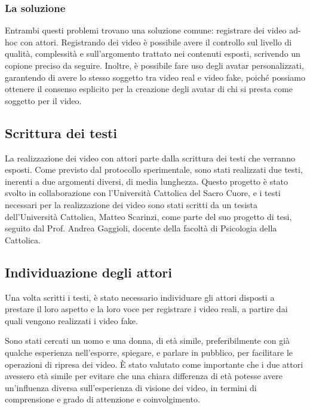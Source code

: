 \subsubsection{La soluzione}

Entrambi questi problemi trovano una soluzione comune: registrare dei video ad-hoc con attori. Registrando dei video è possibile avere il controllo sul livello di qualità, complessità e sull'argomento trattato nei contenuti esposti, scrivendo un copione preciso da seguire. Inoltre, è possibile fare uso degli avatar personalizzati, garantendo di avere lo stesso soggetto tra video real e video fake, poiché possiamo ottenere il consenso esplicito per la creazione degli avatar di chi si presta come soggetto per il video.

\subsection{Scrittura dei testi}

La realizzazione dei video con attori parte dalla scrittura dei testi che verranno esposti. Come previsto dal protocollo sperimentale, sono stati realizzati due testi, inerenti a due argomenti diversi, di media lunghezza. Questo progetto è stato svolto in collaborazione con l'Università Cattolica del Sacro Cuore, e i testi necessari per la realizzazione dei video sono stati scritti da un tesista dell'Università Cattolica, Matteo Scarinzi, come parte del suo progetto di tesi, seguito dal Prof. Andrea Gaggioli, docente della facoltà di Psicologia della Cattolica.

\subsection{Individuazione degli attori}

Una volta scritti i testi, è stato necessario individuare gli attori disposti a prestare il loro aspetto e la loro voce per registrare i video reali, a partire dai quali vengono realizzati i video fake.

Sono stati cercati un uomo e una donna, di età simile, preferibilmente con già qualche esperienza nell'esporre, spiegare, e parlare in pubblico, per facilitare le operazioni di ripresa dei video. È stato valutato come importante che i due attori avessero età simile per evitare che una chiara differenza di età potesse avere un'influenza diversa sull'esperienza di visione dei video, in termini di comprensione e grado di attenzione e coinvolgimento.

